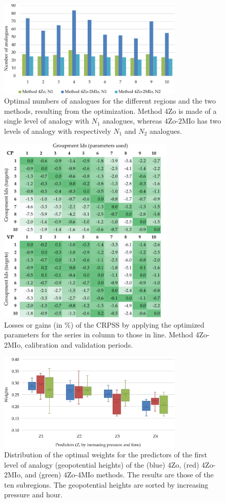 \documentclass[review]{elsarticle}
\begin{document}
\begin{figure}[t]
	\centerline{\includegraphics[width=8.8cm]{figures/fig08.pdf}}
	\caption{Optimal numbers of analogues for the different regions and the two methods, resulting from the optimization. Method 4Zo is made of a single level of analogy with $N_{1}$ analogues, whereas 4Zo-2MIo has two levels of analogy with respectively $N_{1}$ and $N_{2}$ analogues.}
	\label{fig:figure_nb_analogs}
\end{figure}

\begin{figure}[t]
	\centerline{\includegraphics[width=8.4cm]{figures/fig09.pdf}}
	\caption{Losses or gains (in \%) of the CRPSS by applying the optimized parameters for the series in column to those in line. Method 4Zo-2MIo, calibration and validation periods.}
	\label{fig:crossing_4Zo-2MIo}
\end{figure}

\begin{figure}[t]
	\centerline{\includegraphics[width=8.8cm]{figures/fig10.pdf}}
	\caption{Distribution of the optimal weights for the predictors of the first level of analogy (geopotential heights) of the (blue) 4Zo, (red) 4Zo-2MIo, and (green) 4Zo-4MIo methods. The results are those of the ten subregions. The geopotential heights are sorted by increasing pressure and hour.}
	\label{fig:levels_weights_average}
\end{figure}
\end{document}
